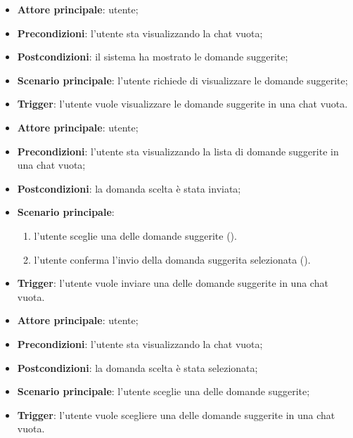 \documentclass[10pt, a4paper]{article}
\begin{document}
    \begin{itemize}
        \item \textbf{Attore principale}: utente;
        \item \textbf{Precondizioni}: l’utente sta visualizzando la chat vuota;
        \item \textbf{Postcondizioni}: il sistema ha mostrato le domande suggerite;
        \item \textbf{Scenario principale}: l’utente richiede di visualizzare le domande suggerite;
        \item \textbf{Trigger}: l’utente vuole visualizzare le domande suggerite in una chat vuota.
    \end{itemize}

    \begin{itemize}
        \item \textbf{Attore principale}: utente;
        \item \textbf{Precondizioni}: l’utente sta visualizzando la lista di domande suggerite in una chat vuota;
        \item \textbf{Postcondizioni}: la domanda scelta è stata inviata;
        \item \textbf{Scenario principale}:
        \begin{enumerate}
            \item l’utente sceglie una delle domande suggerite ().
            \item l’utente conferma l'invio della domanda suggerita selezionata ().
        \end{enumerate}
        \item \textbf{Trigger}: l’utente vuole inviare una delle domande suggerite in una chat vuota.
    \end{itemize}

    \begin{itemize}
        \item \textbf{Attore principale}: utente;
        \item \textbf{Precondizioni}: l’utente sta visualizzando la chat vuota;
        \item \textbf{Postcondizioni}: la domanda scelta è stata selezionata;
        \item \textbf{Scenario principale}: l’utente sceglie una delle domande suggerite;
        \item \textbf{Trigger}: l’utente vuole scegliere una delle domande suggerite in una chat vuota.
    \end{itemize}
\end{document}
